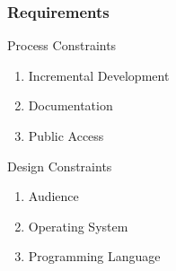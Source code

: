 \begin{frame}
	\centering
	\frametitle{Requirements}
	
	\begin{block}{Process Constraints}
		\begin{enumerate}
			\item Incremental Development
			\item Documentation
			\item Public Access
		\end{enumerate}
	\end{block}
	\pause
	\begin{block}{Design Constraints}
		\begin{enumerate}
			\item Audience
			\item Operating System
			\item Programming Language
		\end{enumerate}
	\end{block}
\end{frame}


